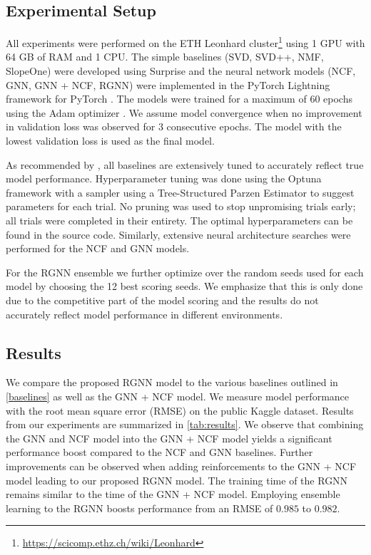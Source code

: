 \subsection{Experimental Setup}
All experiments were performed on the ETH Leonhard cluster\footnote{\url{https://scicomp.ethz.ch/wiki/Leonhard}} using 1 GPU with 64 GB of RAM and 1 CPU. The simple baselines (SVD, SVD++, NMF, SlopeOne) were developed using Surprise \citep{Hug2020} and the neural network models (NCF, GNN, GNN + NCF, RGNN) were implemented in the PyTorch Lightning framework \citep{falcon2019pytorch} for PyTorch \citep{NEURIPS2019_9015}. The models were trained for a maximum of 60 epochs using the Adam optimizer \citep{kingma2014adam}. We assume model convergence when no improvement in validation loss was observed for 3 consecutive epochs. The model with the lowest validation loss is used as the final model.

As recommended by \citet{rendle2019difficulty}, all baselines are extensively tuned to accurately reflect true model performance. Hyperparameter tuning was done using the Optuna framework \citep{akiba2019optuna} with a sampler using a Tree-Structured Parzen Estimator \citep{bergstra2011algorithms} to suggest parameters for each trial. No pruning was used to stop unpromising trials early; all trials were completed in their entirety. The optimal hyperparameters can be found in the source code. Similarly, extensive neural architecture searches were performed for the NCF and GNN models.

For the RGNN ensemble we further optimize over the random seeds used for each model by choosing the 12 best scoring seeds. We emphasize that this is only done due to the competitive part of the model scoring and the results do not accurately reflect model performance in different environments.

\subsection{Results}
We compare the proposed RGNN model to the various baselines outlined in \autoref{baselines} as well as the GNN + NCF model. We measure model performance with the root mean square error (RMSE) on the public Kaggle dataset. Results from our experiments are summarized in \autoref{tab:results}. We observe that combining the GNN and NCF model into the GNN + NCF model yields a significant performance boost compared to the NCF and GNN baselines. Further improvements can be observed when adding reinforcements to the GNN + NCF model leading to our proposed RGNN model. The training time of the RGNN remains similar to the time of the GNN + NCF model. Employing ensemble learning to the RGNN boosts performance from an RMSE of $0.985$ to $0.982$.

